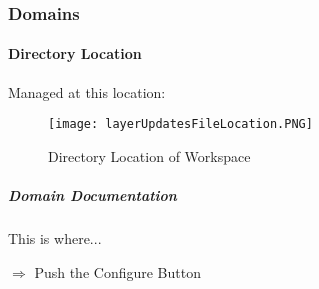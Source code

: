 \subsubsection{Domains}
%
\paragraph[Directory Location]{Directory Location\texorpdfstring{\\}{}}
%
\noindent Managed at this location:
%
\begin{figure}[h!]
\centering
    \texttt{[image: layerUpdatesFileLocation.PNG]}

\caption{Directory Location of Workspace}
\end{figure}
%
%
%

\subparagraph[Domain Documentation]{Domain Documentation\texorpdfstring{\\}{}}
\noindent This is where...

{\Large $\Rightarrow$ Push the Configure Button}



